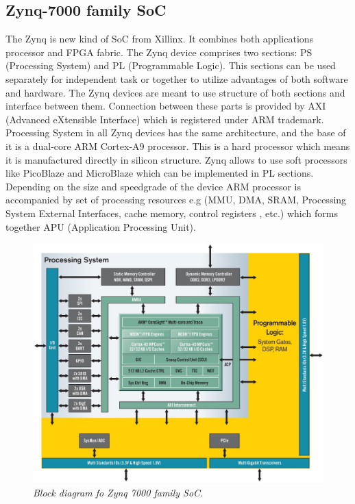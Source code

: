 \documentclass[en,printmode]{mgr}
\begin{document}
		\subsection*{Zynq-7000 family SoC}
		The Zynq is new kind of SoC from Xillinx. It combines both applications processor and FPGA 	
		fabric. The Zynq device comprises two sections: PS (Processing System) and PL (Programmable
		Logic). This sections can be used separately for independent task or together to utilize
		advantages of both software and hardware. The Zynq devices are meant to use structure of
		both sections and interface between them. Connection between these parts is provided by AXI
		(Advanced eXtensible Interface) which is registered under ARM trademark.
		\\
		
		Processing System in all Zynq devices has the same architecture, and the base of it is
		a dual-core ARM Cortex-A9 processor. This is a hard processor which means it is manufactured
		directly in silicon structure. Zynq allows to use soft processors like PicoBlaze and 
		MicroBlaze which can be implemented in PL sections. Depending on the size and speedgrade of
		the device ARM processor is accompanied by set of processing resources e.g (MMU, DMA, SRAM,
		Processing System External Interfaces, cache memory, control registers , etc.) which forms
		together APU (Application Processing Unit).
		
		\begin{figure}[!htb]
    		\centering
   			\includegraphics[width=\textwidth]{images/zynq.jpeg}
   		 	\caption{\textit{Block diagram fo Zynq 7000 family SoC. \cite{zynq_diag}}}
		\end{figure}
		\newpage
\end{document}
